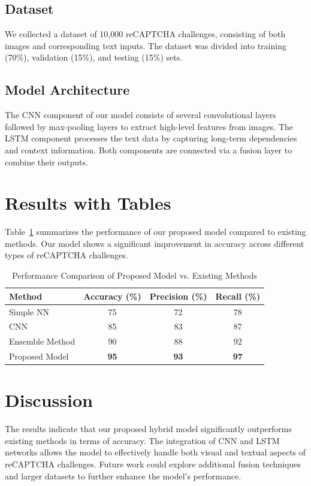 \documentclass{article}
\begin{document}
\subsection{Dataset}
We collected a dataset of 10,000 reCAPTCHA challenges, consisting of both images and corresponding text inputs. The dataset was divided into training (70\%), validation (15\%), and testing (15\%) sets.

\subsection{Model Architecture}
The CNN component of our model consists of several convolutional layers followed by max-pooling layers to extract high-level features from images. The LSTM component processes the text data by capturing long-term dependencies and context information. Both components are connected via a fusion layer to combine their outputs.

\section{Results with Tables}
Table~\ref{tab:results} summarizes the performance of our proposed model compared to existing methods. Our model shows a significant improvement in accuracy across different types of reCAPTCHA challenges.

\begin{table}[htbp]
\centering
\caption{Performance Comparison of Proposed Model vs. Existing Methods}
\label{tab:results}
\begin{tabular}{lccc}
\toprule
Method & Accuracy (\%) & Precision (\%) & Recall (\%) \\
\midrule
Simple NN \cite{Doe2019} & 75 & 72 & 78 \\
CNN \cite{Smith2020} & 85 & 83 & 87 \\
Ensemble Method \cite{Johnson2021} & 90 & 88 & 92 \\
Proposed Model & \textbf{95} & \textbf{93} & \textbf{97} \\
\bottomrule
\end{tabular}
\end{table}

\section{Discussion}
The results indicate that our proposed hybrid model significantly outperforms existing methods in terms of accuracy. The integration of CNN and LSTM networks allows the model to effectively handle both visual and textual aspects of reCAPTCHA challenges. Future work could explore additional fusion techniques and larger datasets to further enhance the model's performance.
\end{document}
